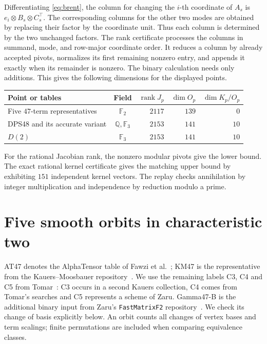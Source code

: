 \documentclass[11pt,reqno]{amsart}
\newcommand{\F}{\mathbb F}
\newcommand{\Q}{\mathbb Q}
\newcommand{\rank}{\operatorname{rank}}
\begin{document}
Differentiating \eqref{eq:brent}, the column for changing the \(i\)-th coordinate of \(A_s\) is \(e_i\otimes B_s\otimes C_s^{\top}\). The corresponding columns for the other two modes are obtained by replacing their factor by the coordinate unit. Thus each column is determined by the two unchanged factors. The rank certificate processes the columns in summand, mode, and row-major coordinate order. It reduces a column by already accepted pivots, normalizes its first remaining nonzero entry, and appends it exactly when its remainder is nonzero. The binary calculation needs only additions. This gives the following dimensions for the displayed points.
\begin{center}
\small
\begin{tabular}{@{}lcrrr@{}}
\toprule
Point or tables & Field & \(\rank J_p\) & \(\dim O_p\) & \(\dim K_p/O_p\)\\
\midrule
Five \(47\)-term representatives & \(\F_2\) & \(2117\) & \(139\) & \(0\)\\
DPS48 and its accurate variant & \(\Q,\F_3\) & \(2153\) & \(141\) & \(10\)\\
\(D(2)\) & \(\F_3\) & \(2153\) & \(141\) & \(10\)\\
\bottomrule
\end{tabular}
\end{center}
For the rational Jacobian rank, the nonzero modular pivots give the lower bound. The exact rational kernel certificate gives the matching upper bound by exhibiting \(151\) independent kernel vectors. The replay checks annihilation by integer multiplication and independence by reduction modulo a prime.

\section{Five smooth orbits in characteristic two}
AT47 denotes the AlphaTensor table of Fawzi et al.~\cite{at}; KM47 is the representative from the Kauers--Moosbauer repository~\cite{km}. We use the remaining labels C3, C4 and C5 from Tomar~\cite[Appendices A and B.1]{tomar}: C3 occurs in a second Kauers collection, C4 comes from Tomar's searches and C5 represents a scheme of Zaru. Gamma47-B is the additional binary input from Zaru's \texttt{FastMatrixF2} repository~\cite{zaru}. We check its change of basis explicitly below. An orbit counts all changes of vertex bases and term scalings; finite permutations are included when comparing equivalence classes.
\end{document}
